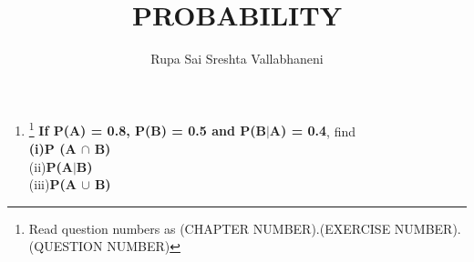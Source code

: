 \documentclass{article}
\begin{document}
\title{PROBABILITY}
\author{\Large Rupa Sai Sreshta Vallabhaneni}
\date{}

\maketitle
\begin{enumerate}[label=13.\arabic{enumi}.\arabic{enumii}]%
\setcounter{enumi}{0}
\setcounter{enumii}{3}

\item \footnote{Read question numbers as (CHAPTER NUMBER).(EXERCISE NUMBER).(QUESTION NUMBER)} \textbf{ {If P(A) = 0.8, P(B) = 0.5} and P(B$\vert$A) = 0.4}, find  \\
\textbf{(i)P (A $\cap$ B)} \\
 (ii)\textbf{P(A$\vert$B)}\\
 (iii)\textbf{P(A $\cup$ B)}
\\[1ex]


\end{enumerate}
\end{document}
